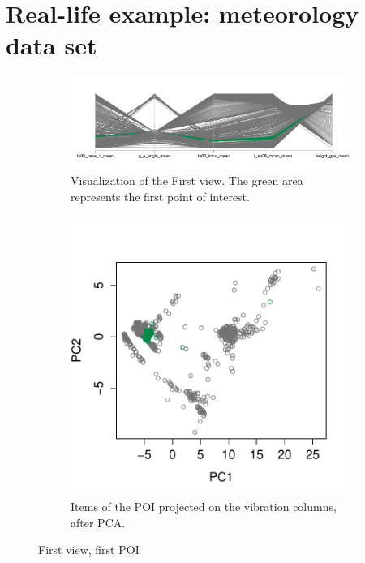 \section{Real-life example: meteorology data set}

\begin{figure}[t!]
        \centering
        \begin{subfigure}[b]{0.75\textwidth}
                \includegraphics[width=\textwidth]{images/vibration_group_1}
                \caption{Visualization of the First view. The green area
                represents the first point of interest.}
                \label{fig:vibration_group_1}
        \end{subfigure}%
        \begin{subfigure}[b]{0.25\textwidth}
                \includegraphics[width=\textwidth]{images/vibration_target_1}
                \caption{Items of the POI projected on the vibration columns,
                after PCA.}
                \label{fig:/vibration_target_2}
        \end{subfigure}
        \caption{First view, first POI}\label{fig:vibra-group1}
\end{figure}

